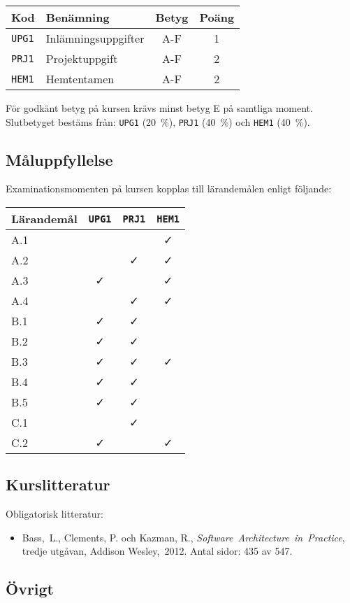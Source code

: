 \begin{longtable}[]{@{}llcc@{}}
\toprule
\textsf{Kod} & \textsf{Benämning} & \textsf{Betyg} & \textsf{Poäng}\tabularnewline
\midrule
\endhead
\texttt{UPG1} & Inlämningsuppgifter & A-F & 1\tabularnewline
\texttt{PRJ1} & Projektuppgift & A-F & 2\tabularnewline
\texttt{HEM1} & Hemtentamen & A-F & 2\tabularnewline
\bottomrule
\end{longtable}

För godkänt betyg på kursen krävs minst betyg E på samtliga moment.
Slutbetyget bestäms från: \texttt{UPG1} (20~\%), \texttt{PRJ1} (40~\%) och \texttt{HEM1} (40~\%).

\subsection*{Måluppfyllelse}

Examinationsmomenten på kursen kopplas till lärandemålen enligt
följande:

\begin{longtable}[]{@{}lccc@{}}
\toprule
\textsf{Lärandemål} & \texttt{UPG1} & \texttt{PRJ1} & \texttt{HEM1}\tabularnewline
\midrule
\endhead
A.1 & & & \faCheck\tabularnewline
A.2 & & \faCheck & \faCheck\tabularnewline
A.3 & \faCheck & & \faCheck\tabularnewline
A.4 & & \faCheck & \faCheck\tabularnewline
B.1 & \faCheck & \faCheck &\tabularnewline
B.2 & \faCheck & \faCheck &\tabularnewline
B.3 & \faCheck & \faCheck & \faCheck\tabularnewline
B.4 & \faCheck & \faCheck &\tabularnewline
B.5 & \faCheck & \faCheck &\tabularnewline
C.1 & & \faCheck &\tabularnewline
C.2 & \faCheck & & \faCheck\tabularnewline
\bottomrule
\end{longtable}

\subsection*{Kurslitteratur}

Obligatorisk litteratur:

\begin{itemize}
\tightlist
\item
  Bass,~L., Clements, P. och Kazman, R.,
  \emph{Software~Architecture~in~Practice}, tredje utgåvan, Addison­
  Wesley,~2012. Antal sidor: 435 av 547.
\end{itemize}

\subsection*{Övrigt}

